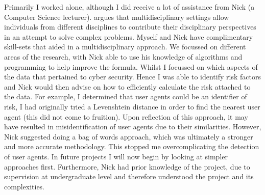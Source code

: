 Primarily I worked alone, although I did receive a lot of assistance from Nick (a Computer Science lecturer). \cite{thurow1999dynamics} argues that multidisciplinary settings allow individuals from different disciplines to contribute their disciplinary perspectives in an attempt to solve complex problems. Myself and Nick have complimentary skill-sets that aided in a multidisciplinary approach. We focussed on different areas of the research, with Nick able to use his knowledge of algorithms and programming to help improve the formula. Whilst I focussed on which aspects of the data that pertained to cyber security. Hence I was able to identify risk factors and Nick would then advise on how to efficiently calculate the risk attached to the data. For example, I determined that user agents could be an identifier of risk, I had originally tried a Levenshtein distance in order to find the nearest user agent (this did not come to fruition). Upon reflection of this approach, it may have resulted in misidentification of user agents due to their similarities. However, Nick suggested doing a bag of words approach, which was ultimately a stronger and more accurate methodology. This stopped me overcomplicating the detection of user agents. In future projects I will now begin by looking at simpler approaches first. Furthermore, Nick had prior knowledge of the project, due to supervision at undergraduate level and therefore understood the project and its complexities. 



